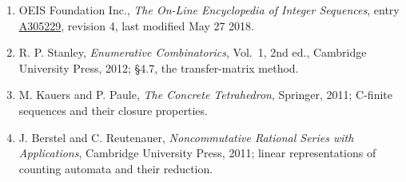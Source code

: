 \documentclass[11pt]{article}
\theoremstyle{definition}
\begin{document}
\begin{enumerate}

\item OEIS Foundation Inc., \emph{The On-Line Encyclopedia of Integer Sequences}, entry \href{https://oeis.org/A305229}{A305229}, revision 4, last modified May 27 2018.

\item R. P. Stanley, \emph{Enumerative Combinatorics}, Vol.~1, 2nd ed., Cambridge University Press, 2012; \S4.7, the transfer-matrix method.

\item M. Kauers and P. Paule, \emph{The Concrete Tetrahedron}, Springer, 2011; C-finite sequences and their closure properties.

\item J. Berstel and C. Reutenauer, \emph{Noncommutative Rational Series with Applications}, Cambridge University Press, 2011; linear representations of counting automata and their reduction.

\end{enumerate}
\end{document}
